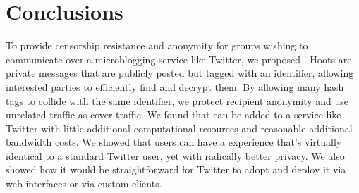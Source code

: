 \section{Conclusions}

To provide censorship resistance and anonymity for groups wishing to communicate over a microblogging service like Twitter, we proposed \hoot. Hoots are private messages that are publicly posted but tagged with an identifier, allowing interested parties to efficiently find and decrypt them. By allowing many hash tags to collide with the same identifier, we protect recipient anonymity and use unrelated traffic as cover traffic. We found that \hoot can be added to a service like Twitter with little additional computational resources and reasonable additional bandwidth costs. We showed that users can have a experience that's virtually identical to a standard Twitter user, yet with radically better privacy. We also showed how it would be straightforward for Twitter to adopt \hoot and deploy it via web interfaces or via custom clients.

